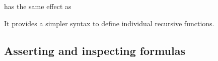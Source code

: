 \begin{description}

\smallskip

%
\item[\expr{(define-fun-rec $f$ (($x_1$ $\tau_1$) $\cdots$ ($x_n$ $\tau_n$)) $\tau$ $t$)}]
has the same effect as
\begin{center}
\end{center}
It provides a simpler syntax to define individual recursive functions.

\end{description}


\subsection{Asserting and inspecting formulas} \label{sec:assert}

